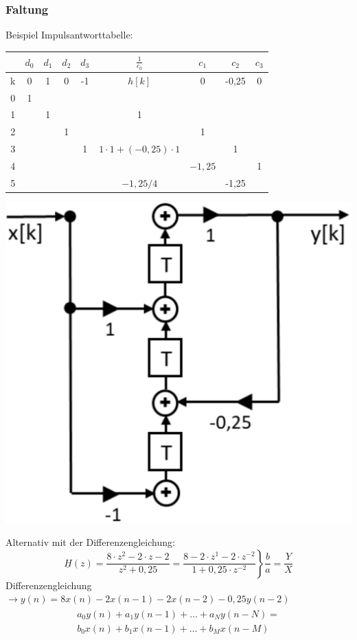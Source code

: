 \subsubsection{Faltung}

\vspace{1ex}
Beispiel Impulsantworttabelle:
\vspace{-1em}
\begin{center}
	\begin{table}[H]
		\footnotesize
		\centering
		\begin{tabular}{|c|cccc|c|ccc|}
			\hline
			  & $d_0$ & $d_1$ & $d_2$ & $d_3$ & $\frac{1}{c_0}$               & $c_1$    & $c_2$ & $c_3$ \\
			\hline
			k & 0     & 1     & 0     & -1    & $h[k]$                        & 0        & -0,25 & 0     \\
			\hline
			0 & 1     &       &       &       &                               &          &       &       \\
			\hline
			1 &       & 1     &       &       & 1                             &          &       &       \\
			\hline
			2 &       &       & 1     &       &                               & 1        &       &       \\
			\hline
			3 &       &       &       & 1     & $1 \cdot 1 + (-0,25) \cdot 1$ &          & 1     &       \\
			\hline
			4 &       &       &       &       &                               & $-1,25 $ &       & 1     \\
			\hline
			5 &       &       &       &       & $-1,25/4$                     &          & -1,25 &       \\
			\hline
		\end{tabular}
	\end{table}

	\includegraphics[width=0.4\columnwidth]{Bilder/Signalflussdiagramm}
\end{center}

Alternativ mit der Differenzengleichung:
\[
	\left.\underline{H}(z)=\frac{8 \cdot z^{2}-2 \cdot z-2}{z^{2}+0,25} = \frac{8 -2 \cdot z^1-2 \cdot z^{-2}}{1 + 0,25 \cdot z^{-2}}\right\} \frac{b}{a}=\frac{Y}{X}
\]
Differenzengleichung $\rightarrow y(n) = 8x(n) -2x(n-1)-2x(n-2)-0,25y(n-2)$
\begin{align*}
	\begin{split}
		a_{0} y(n)+a_{1} y(n-1)+\ldots+a_{N} y(n-N)=\\
		b_{0} x(n)+b_{1} x(n-1)+\ldots+b_{M} x(n-M)
	\end{split}
\end{align*}

